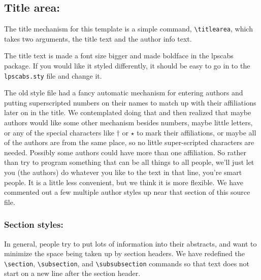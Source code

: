 \documentclass[twoside]{article}
\begin{document}
\subsection*{\hspace{0.5cm}Title area:}
The title mechanism for this template is a simple command, \verb=\titlearea=, which takes two arguments, the title text and the author info text.

The title text is made a font size bigger and made boldface in the lpscabs package.
If you would like it styled differently, it should be easy to go in to the \texttt{lpscabs.sty} file and change it.

The old style file had a fancy automatic mechanism for entering authors and putting superscripted numbers on their names to match up with their affiliations later on in the title.
We contemplated doing that and then realized that maybe authors would like some other mechanism besides numbers, maybe little letters, or any of the special characters like $\dag$ or $\star$ to mark their affiliations, or maybe all of the authors are from the same place, so no little super-scripted characters are needed.
Possibly some authors could have more than one affiliation.
So rather than try to program something that can be all things to all people, we'll just let you (the authors) do whatever you like to the text in that line, you're smart people.
It is a little less convenient, but we think it is more flexible.
We have commented out a few multiple author styles up near that section of this source file.

\subsubsection*{\hspace{0.5cm}Section styles:}
In general, people try to put lots of information into their abstracts, and want to minimize the space being taken up by section headers.
We have redefined the \verb=\section=, \verb=\subsection=, and \verb=\subsubsection= commands so that text does not start on a new line after the section header.
\end{document}

